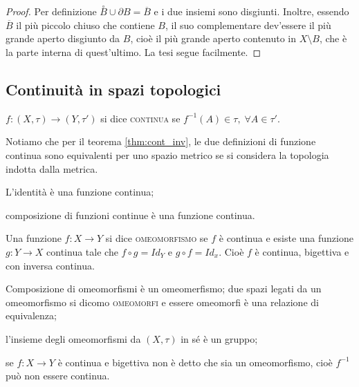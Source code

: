 \documentclass{article}
\begin{document}
\begin{proof}
	Per definizione $\stackrel{\circ}{B} \cup \partial B=\overline{B}$ e i due insiemi sono disgiunti. Inoltre, essendo $\overline B$ il più piccolo chiuso che contiene $B$, il suo complementare dev'essere il più grande aperto disgiunto da $B$, cioè il più grande aperto contenuto in $X \setminus B$, che è la parte interna di quest'ultimo. La tesi segue facilmente.
\end{proof}

\subsection{Continuità in spazi topologici}

\begin{defn}
$f: (X, \tau) \rightarrow (Y, \tau')$ si dice \textsc{continua} se ${f^{-1}(A)
\in \tau,}\; {\forall A \in \tau'}$.
\end{defn}

Notiamo che per il teorema \ref{thm:cont_inv}, le due
definizioni di funzione continua sono equivalenti per uno spazio metrico se si
considera la topologia indotta dalla metrica.

\begin{thm}
\begin{nlist}
\item L'identità è una funzione continua;
\item composizione di funzioni continue è una funzione continua.
\end{nlist}
\end{thm}

\begin{defn}
Una funzione $f: X \rightarrow Y$ si dice \textsc{omeomorfismo} se $f$ è
continua e esiste una funzione $g:Y\rightarrow X$ continua tale che $f \circ g =
Id_Y$ e $g \circ f = Id_x$. Cio\`e $f$ \`e continua, bigettiva e con inversa
continua.
\end{defn}

\begin{oss}
	\begin{nlist}
	\item Composizione di omeomorfismi è un omeomerfismo; due spazi legati da un omeomorfismo si dicomo \textsc{omeomorfi} e essere omeomorfi è una relazione di equivalenza;
	\item l'insieme degli omeomorfismi da $(X, \tau)$ in sé è un gruppo;
	\item \warningsign\quad se $f:X \rightarrow Y$ è continua e bigettiva non è detto che sia un omeomorfismo, cioè $f^{-1}$ può non essere continua.
\end{nlist}
\end{oss}
\end{document}
